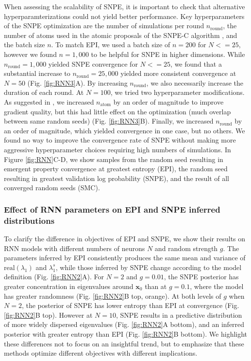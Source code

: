 \documentclass[11pt]{article}
\begin{document}
When assessing the scalability of SNPE, it is important to check that alternative hyperparamterizations could not yield better performance.
Key hyperparameters of the SNPE optimization are the number of simulations per round $n_{\text{round}}$, the number of atoms used in the atomic proposals of the SNPE-C algorithm \cite{greenberg2019automatic}, and the batch size $n$.
To match EPI, we used a batch size of $n = 200$ for $N <= 25$, however we found $n=1,000$ to be helpful for SNPE in higher dimensions.
While $n_{\text{round}} = 1,000$ yielded SNPE convergence for $N <= 25$, we found that a substantial increase to $n_{\text{round}} = 25,000$ yielded more consistent convergence at $N=50$ (Fig. \ref{fig:RNN3}A).
By increasing $n_{\text{round}}$, we also necessarily increase the duration of each round.
At $N=100$, we tried two hyperparameter modifications.
As suggested in \cite{greenberg2019automatic}, we increased $n_{\text{atom}}$ by an order of magnitude to improve gradient quality, but this had little effect on the optimization (much overlap between same random seeds) (Fig. \ref{fig:RNN3}B).
Finally, we increased $n_{\text{round}}$ by an order of magnitude, which yielded convergence in one case, but no others.
We found no way to improve the convergence rate of SNPE without making more aggressive hyperparameter choices requiring high numbers of simulations.
In Figure \ref{fig:RNN}C-D, we show samples from the random seed resulting in emergent property convergence at greatest entropy (EPI), the random seed resulting in greatest validation log probability (SNPE), and the result of all converged random seeds (SMC).

\subsubsection{Effect of RNN parameters on EPI and SNPE inferred distributions} \label{methods_RNN_params}
To clarify the difference in objectives of EPI and SNPE, we show their results on RNN models with different numbers of neurons $N$ and random strength $g$.  
The parameters inferred by EPI consistently produces the same mean and variance of $\text{real}(\lambda_1)$ and $\lambda_1^s$, while those inferred by SNPE change according to the model definition (Fig. \ref{fig:RNN2}A).
For $N=2$ and $g=0.01$, the SNPE posterior has greater concentration in eigenvalues around $\mathbf{x}_0$ than at $g=0.1$, where the model has greater randomness (Fig. \ref{fig:RNN2}B top, orange).
At both levels of $g$ when $N=2$, the posterior of SNPE has lower entropy than EPI at convergence (Fig. \ref{fig:RNN2}B top).
However at $N=10$, SNPE results in a predictive distribution of more widely dispersed eigenvalues (Fig. \ref{fig:RNN2}A bottom), and an inferred posterior with greater entropy than EPI (Fig. \ref{fig:RNN2}B bottom).
We highlight these differences not to focus on an insightful trend, but to emphasize that these methods optimize different objectives with different implications.
\end{document}
